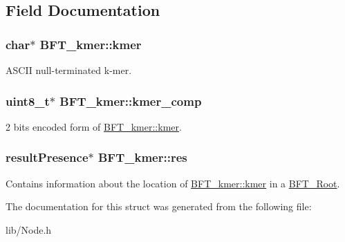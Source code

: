 \subsection{Field Documentation}
\hypertarget{structBFT__kmer_ae4cf6766f01ebfa54fe51d0e60bec942}{}
\subsubsection[{kmer}]{\setlength{\rightskip}{0pt plus 5cm}char$\ast$ B\+F\+T\+\_\+kmer\+::kmer}\label{structBFT__kmer_ae4cf6766f01ebfa54fe51d0e60bec942}


A\+S\+C\+I\+I null-\/terminated k-\/mer. 

\hypertarget{structBFT__kmer_a9935a78617deffcf7a24fcca0143962c}{}
\subsubsection[{kmer\+\_\+comp}]{\setlength{\rightskip}{0pt plus 5cm}uint8\+\_\+t$\ast$ B\+F\+T\+\_\+kmer\+::kmer\+\_\+comp}\label{structBFT__kmer_a9935a78617deffcf7a24fcca0143962c}


2 bits encoded form of \hyperlink{structBFT__kmer_ae4cf6766f01ebfa54fe51d0e60bec942}{B\+F\+T\+\_\+kmer\+::kmer}. 

\hypertarget{structBFT__kmer_aab6ab4e17d069ebb9e5c467d8fee5002}{}
\subsubsection[{res}]{\setlength{\rightskip}{0pt plus 5cm}result\+Presence$\ast$ B\+F\+T\+\_\+kmer\+::res}\label{structBFT__kmer_aab6ab4e17d069ebb9e5c467d8fee5002}


Contains information about the location of \hyperlink{structBFT__kmer_ae4cf6766f01ebfa54fe51d0e60bec942}{B\+F\+T\+\_\+kmer\+::kmer} in a \hyperlink{structBFT__Root}{B\+F\+T\+\_\+\+Root}. 



The documentation for this struct was generated from the following file\+:\begin{DoxyCompactItemize}
\item 
lib/Node.\+h\end{DoxyCompactItemize}
